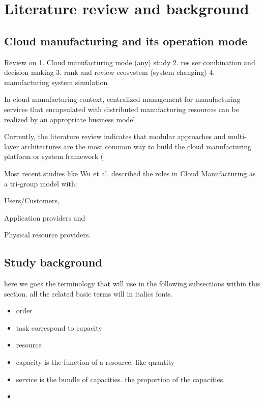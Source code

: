 \section{Literature review and background} %
\label{sec:literature_review}
\subsection{Cloud manufacturing and its operation mode} %
\label{sub:cloud_manufacturing review}

Review on 1. Cloud manufacturing mode (any) study 
2. res ser combination and decision making
3. rank and review ecosystem (system changing)
4. manufacturing system simulation

In cloud manufacturing context, centralized management for manufacturing services that encapsulated with distributed manufacturing resources can be realized by an appropriate business model\cite{Xu2012}

Currently, the literature review indicates that modular approaches and multi-layer architectures are the most common way to build the cloud manufacturing platform or system framework (\cite{Tao2012}\cite{Valilai2013}




Most recent studies like Wu et al.\cite{Wu2013} described the roles in Cloud Manufacturing as a tri-group model with:\begin{inparaenum}[1)]
\item Users/Customers,
\item Application providers and
\item Physical resource providers.
\end{inparaenum}


\subsection{Study background} %
\label{sub:background}




here we goes the terminology that will use in the following subsections within this section. all the related basic terms will in italics fonts.
\begin{itemize}
	\item order
	\item task correspond to capacity
	\item resource
	\item capacity is the function of a resource. like quantity
	\item service is the bundle of capacities. the proportion of the capacities.
	\item 
\end{itemize}

